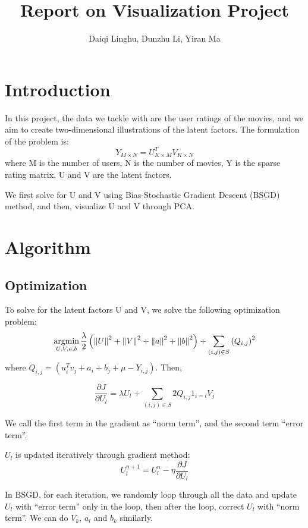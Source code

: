 \documentclass[12pt]{article}
\title{Report on Visualization Project}
\author{Daiqi Linghu, Dunzhu Li, Yiran Ma}
\date{} %
\newcommand{\argmin}{\operatornamewithlimits{argmin}}
\newcommand\norm[1]{\left\lVert#1\right\rVert}
\begin{document}
\maketitle

\section{Introduction}
In this project, the data we tackle with are the user ratings of the movies, and we aim to create two-dimensional illustrations of the latent factors. The formulation of the problem is:
\begin{equation*}
Y_{M\times N} = U_{K\times M}^{T} V_{K\times N}
\end{equation*}
where M is the number of users, N is the number of movies, Y is the sparse rating matrix, U and V are the latent factors. 

We first solve for U and V using Bias-Stochastic Gradient Descent (BSGD) method, and then, visualize U and V through PCA.

\section{Algorithm}
\subsection{Optimization}
To solve for the latent factors U and V, we solve the following optimization problem:
\begin{equation*}
\argmin_{U,V,a,b}\frac{\lambda}{2}\left(\norm{U}^2+\norm{V}^2+\norm{a}^2+\norm{b}^2\right)+
\sum_{(i,j)\in S}\left(  Q_{i,j}  \right)^2
\end{equation*}
where $Q_{i,j}=(u_i^T v_j + a_i + b_j +\mu-Y_{i,j})$. Then,

\begin{equation*}
\frac{\partial{J}}{\partial{U_{l}}}=\lambda U_{l}+\sum_{(i,j)\in S}2Q_{i,j}1_{i=l}V_{j}
\end{equation*}

We call the first term in the gradient as ``norm term'', and the second term ``error term''.

$U_{l}$ is updated iteratively through gradient method:
\begin{equation*}
U_{l}^{n+1}=U_{l}^{n}-\eta \frac{\partial{J}}{\partial{U_{l}}}
\end{equation*}

In BSGD, for each iteration, we randomly loop through all the data and update $U_{l}$ with ``error term'' only in the loop, then after the loop, correct $U_{l}$ with ``norm term''. We can do $V_{k}$, $a_{l}$ and $b_{k}$ similarly.
\end{document}
